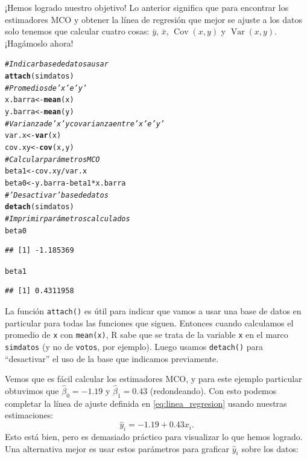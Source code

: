 \documentclass{report}\usepackage[]{graphicx}\usepackage[]{color}
\makeatletter
\newcommand{\hlcom}[1]{\textcolor[rgb]{0.678,0.584,0.686}{\textit{#1}}}%
\newcommand{\hlopt}[1]{\textcolor[rgb]{0,0,0}{#1}}%
\newcommand{\hlstd}[1]{\textcolor[rgb]{0.345,0.345,0.345}{#1}}%
\newcommand{\hlkwb}[1]{\textcolor[rgb]{0.69,0.353,0.396}{#1}}%
\newcommand{\hlkwd}[1]{\textcolor[rgb]{0.737,0.353,0.396}{\textbf{#1}}}%
\newenvironment{kframe}{%
 \def\at@end@of@kframe{}%
 \ifinner\ifhmode%
  \def\at@end@of@kframe{\end{minipage}}%
  \begin{minipage}{\columnwidth}%
 \fi\fi%
 \def\FrameCommand##1{\hskip\@totalleftmargin \hskip-\fboxsep
 \colorbox{shadecolor}{##1}\hskip-\fboxsep
     \hskip-\linewidth \hskip-\@totalleftmargin \hskip\columnwidth}%
 \MakeFramed {\advance\hsize-\width
   \@totalleftmargin\z@ \linewidth\hsize
   \@setminipage}}%
 {\par\unskip\endMakeFramed%
 \at@end@of@kframe}
\newenvironment{knitrout}{}{} %
\newcommand{\Var}{\operatorname{Var}}
\newcommand{\Cov}{\operatorname{Cov}}
\makeatother
\begin{document}
¡Hemos logrado nuestro objetivo!
Lo anterior significa que para encontrar los estimadores MCO y obtener la línea de regresión que mejor se ajuste a los datos solo tenemos que calcular cuatro cosas: $\bar y$, $\bar x$, $\Cov (x,y)$ y $\Var (x,y)$. ¡Hagámoslo ahora!

\begin{knitrout}
\color{fgcolor}\begin{kframe}
\begin{alltt}
\hlcom{# Indicar base de datos a usar}
\hlkwd{attach}\hlstd{(simdatos)}
\hlcom{# Promedios de 'x' e 'y'}
\hlstd{x.barra} \hlkwb{<-} \hlkwd{mean}\hlstd{(x)}
\hlstd{y.barra} \hlkwb{<-} \hlkwd{mean}\hlstd{(y)}
\hlcom{# Varianza de 'x' y covarianza entre 'x' e 'y'}
\hlstd{var.x} \hlkwb{<-} \hlkwd{var}\hlstd{(x)}
\hlstd{cov.xy} \hlkwb{<-} \hlkwd{cov}\hlstd{(x,y)}
\hlcom{# Calcular parámetros MCO}
\hlstd{beta1} \hlkwb{<-} \hlstd{cov.xy}\hlopt{/}\hlstd{var.x}
\hlstd{beta0} \hlkwb{<-} \hlstd{y.barra} \hlopt{-} \hlstd{beta1}\hlopt{*}\hlstd{x.barra}
\hlcom{# 'Desactivar' base de datos}
\hlkwd{detach}\hlstd{(simdatos)}
\hlcom{# Imprimir parámetros calculados}
\hlstd{beta0}
\end{alltt}
\begin{verbatim}
## [1] -1.185369
\end{verbatim}
\begin{alltt}
\hlstd{beta1}
\end{alltt}
\begin{verbatim}
## [1] 0.4311958
\end{verbatim}
\end{kframe}
\end{knitrout}

\begin{Rbox}
La función \verb|attach()| es útil para indicar que vamos a usar una base de datos en particular para todas las funciones que siguen. Entonces cuando calculamos el promedio de \verb|x| con \verb|mean(x)|, R sabe que se trata de la variable \verb|x| en el marco \verb|simdatos| (y no de \verb|votos|, por ejemplo). Luego usamos \verb|detach()| para ``desactivar'' el uso de la base que indicamos previamente.
\end{Rbox}

Vemos que es fácil calcular los estimadores MCO, y para este ejemplo particular obtuvimos que $\hat \beta_0 = -1.19$ y $\hat \beta_1 = 0.43$ (redondeando).
Con esto podemos completar la línea de ajuste definida en \eqref{eq:linea_regresion} usando nuestras estimaciones:
\begin{equation*}
\hat y_i = -1.19 + 0.43x_i.
\end{equation*}
Esto está bien, pero es demasiado práctico para visualizar lo que hemos logrado.
Una alternativa mejor es usar estos parámetros para graficar $\hat y_i$ sobre los datos:
\end{document}
